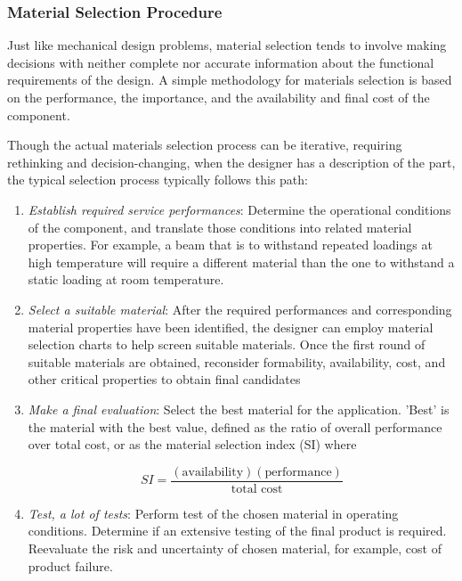 \documentclass[a4paper,openany,nobib]{tufte-book}
\begin{document}
\subsubsection{Material Selection Procedure}
\label{material-selection-procedure}
Just like mechanical design problems, material selection tends to
involve making decisions with neither complete nor accurate information
about the functional requirements of the design. A simple methodology
for materials selection is based on the performance, the importance, and
the availability and final cost of the component.

Though the actual materials selection process can be iterative,
requiring rethinking and decision-changing, when the designer has a
description of the part, the typical selection process typically follows
this path:

\begin{enumerate}
\item \emph{Establish required service performances}: Determine the operational
conditions of the component, and translate those conditions into
related material properties. For example, a beam that is to withstand
repeated loadings at high temperature will require a different
material than the one to withstand a static loading at room
temperature.

\item \emph{Select a suitable material}: After the required performances and
corresponding material properties have been identified, the designer
can employ material selection charts to help screen suitable
materials. Once the first round of suitable materials are obtained,
reconsider formability, availability, cost, and other critical
properties to obtain final candidates

\item \emph{Make a final evaluation}: Select the best material for the
application. 'Best' is the material with the best value, defined as
the ratio of overall performance over total cost, or as the material
selection index (SI) where

$$SI = \frac{(\text{availability})(\text{performance})}{\text{total cost}}$$

\item \emph{Test, a lot of tests}: Perform test of the chosen material in
operating conditions. Determine if an extensive testing of the final
product is required. Reevaluate the risk and uncertainty of chosen
material, for example, cost of product failure.
\end{enumerate}
\end{document}
